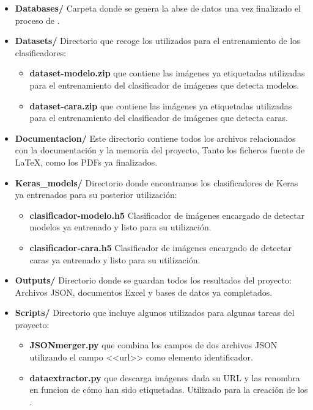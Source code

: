 \begin{itemize}
\begin{itemize}
        \end{itemize}
    \item \textbf{Databases/} Carpeta donde se genera la abse de datos una vez finalizado el proceso de .
    \item \textbf{Datasets/} Directorio que recoge los  utilizados para el entrenamiento de los clasificadores:
        \begin{itemize}
            \item \textbf{dataset-modelo.zip}  que contiene las imágenes ya etiquetadas utilizadas para el entrenamiento del clasificador de imágenes que detecta modelos.
            \item \textbf{dataset-cara.zip}  que contiene las imágenes ya etiquetadas utilizadas para el entrenamiento del clasificador de imágenes que detecta caras.
        \end{itemize}
    \item \textbf{Documentacion/} Este directorio contiene todos los archivos relacionados con la documentación y la memoria del proyecto, Tanto los ficheros fuente de \LaTeX{}, como los PDFs ya finalizados.
    \item \textbf{Keras\_models/} Directorio donde encontramos los clasificadores de Keras ya entrenados para su posterior utilización:
        \begin{itemize}
            \item \textbf{clasificador-modelo.h5} Clasificador de imágenes encargado de detectar modelos ya entrenado y listo para su utilización.
            \item \textbf{clasificador-cara.h5} Clasificador de imágenes encargado de detectar caras ya entrenado y listo para su utilización.
        \end{itemize}
    \item \textbf{Outputs/} Directorio donde se guardan todos los resultados del proyecto: Archivos JSON, documentos Excel y bases de datos ya completados.
    \item \textbf{Scripts/} Directorio que incluye algunos  utilizados para algunas tareas del proyecto:
        \begin{itemize}
            \item \textbf{JSONmerger.py}  que combina los campos de dos archivos JSON utilizando el campo <<url>> como elemento identificador.
            \item \textbf{dataextractor.py}  que descarga imágenes dada su URL y las renombra en funcion de cómo han sido etiquetadas. Utilizado para la creación de los .

\end{itemize}
\end{itemize}
